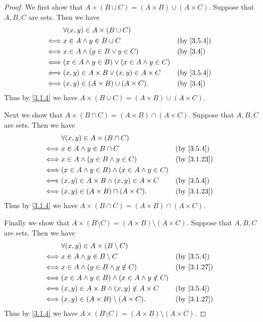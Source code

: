 \begin{proof}
	We first show that \(A \times (B \cup C) = (A \times B) \cup (A \times C)\).
	Suppose that \(A, B, C\) are sets.
	Then we have
	\begin{align*}
		     & \forall (x, y) \in A \times (B \cup C)                               \\
		\iff & x \in A \land y \in B \cup C                         &  & \by{3.5.4} \\
		\iff & x \in A \land (y \in B \lor y \in C)                 &  & \by{3.4}   \\
		\iff & (x \in A \land y \in B) \lor (x \in A \land y \in C)                 \\
		\iff & (x, y) \in A \times B \lor (x, y) \in A \times C     &  & \by{3.5.4} \\
		\iff & (x, y) \in (A \times B) \cup (A \times C).           &  & \by{3.4}
	\end{align*}
	Thus by \cref{3.1.4} we have \(A \times (B \cup C) = (A \times B) \cup (A \times C)\).

	Next we show that \(A \times (B \cap C) = (A \times B) \cap (A \times C)\).
	Suppose that \(A, B, C\) are sets.
	Then we have
	\begin{align*}
		     & \forall (x, y) \in A \times (B \cap C)                                 \\
		\iff & x \in A \land y \in B \cap C                          &  & \by{3.5.4}  \\
		\iff & x \in A \land (y \in B \land y \in C)                 &  & \by{3.1.23} \\
		\iff & (x \in A \land y \in B) \land (x \in A \land y \in C)                  \\
		\iff & (x, y) \in A \times B \land (x, y) \in A \times C     &  & \by{3.5.4}  \\
		\iff & (x, y) \in (A \times B) \cap (A \times C).            &  & \by{3.1.23}
	\end{align*}
	Thus by \cref{3.1.4} we have \(A \times (B \cap C) = (A \times B) \cap (A \times C)\).

	Finally we show that \(A \times (B \setminus C) = (A \times B) \setminus (A \times C)\).
	Suppose that \(A, B, C\) are sets.
	Then we have
	\begin{align*}
		     & \forall (x, y) \in A \times (B \setminus C)                               \\
		\iff & x \in A \land y \in B \setminus C                        &  & \by{3.5.4}  \\
		\iff & x \in A \land (y \in B \land y \notin C)                 &  & \by{3.1.27} \\
		\iff & (x \in A \land y \in B) \land (x \in A \land y \notin C)                  \\
		\iff & (x, y) \in A \times B \land (x, y) \notin A \times C     &  & \by{3.5.4}  \\
		\iff & (x, y) \in (A \times B) \setminus (A \times C).          &  & \by{3.1.27}
	\end{align*}
	Thus by \cref{3.1.4} we have \(A \times (B \setminus C) = (A \times B) \setminus (A \times C)\).
\end{proof}

